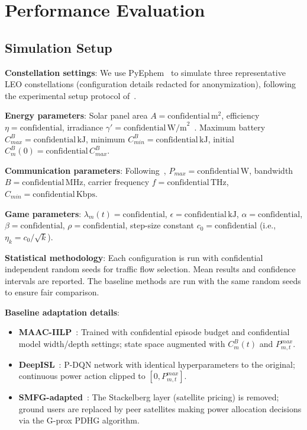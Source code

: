 \documentclass[journal]{IEEEtran}
\newcommand{\CB}{C^{B}}
\newcommand{\CBmin}{C^{B}_{min}}
\newcommand{\CBmax}{C^{B}_{max}}
\newcommand{\Pmax}{P_{max}}
\begin{document}
\section{Performance Evaluation}
\label{sec:simulation}

\subsection{Simulation Setup}

\textbf{Constellation settings}: We use
PyEphem~\cite{cen2024satflow} to simulate three representative LEO constellations (configuration details redacted for anonymization), following the experimental setup protocol of~\cite{cen2024satflow}.

\textbf{Energy parameters}: Solar panel area
$A=\text{confidential}\,\mathrm{m}^2$, efficiency $\eta=\text{confidential}$, irradiance $\gamma'=\text{confidential}\,\mathrm{W/m}^2$~\cite{li2023energy}. Maximum battery $\CBmax=\text{confidential}\,\mathrm{kJ}$, minimum $\CBmin=\text{confidential}\,\mathrm{kJ}$, initial $\CB_m(0)=\text{confidential}\,\CBmax$.

\textbf{Communication parameters}:
Following~\cite{cen2024satflow}, $\Pmax=\text{confidential}\,\mathrm{W}$, bandwidth $B=\text{confidential}\,\mathrm{MHz}$, carrier frequency $f=\text{confidential}\,\mathrm{THz}$, $C_{min}=\text{confidential}\,\mathrm{Kbps}$.

\textbf{Game parameters}: $\lambda_m(t)=\text{confidential}$,
$\epsilon=\text{confidential}\,\mathrm{kJ}$, $\alpha=\text{confidential}$, $\beta=\text{confidential}$, $\rho=\text{confidential}$, step-size constant $c_0=\text{confidential}$ (i.e., $\eta_k=c_0/\sqrt{k}$).

\textbf{Statistical methodology}: Each configuration
is run with confidential independent random seeds for traffic flow selection. Mean results and confidence intervals are reported. The baseline methods are run with the same random seeds to ensure fair comparison.

\textbf{Baseline adaptation details}:
\begin{itemize}
    \item \textbf{MAAC-IILP}~\cite{li2023energy}:
Trained with confidential episode budget and confidential model width/depth settings; state space augmented with $\CB_m(t)$ and $P_{m,t}^{max}$.
    \item \textbf{DeepISL}~\cite{li2023deepisl}:
P-DQN network with identical hyperparameters to the original; continuous power action clipped to $[0, P_{m,t}^{max}]$.
    \item \textbf{SMFG-adapted}~\cite{wang2023smfg}:
The Stackelberg layer (satellite pricing) is removed; ground users are replaced by peer satellites making power allocation decisions via the G-prox PDHG algorithm.
\end{itemize}
\end{document}
